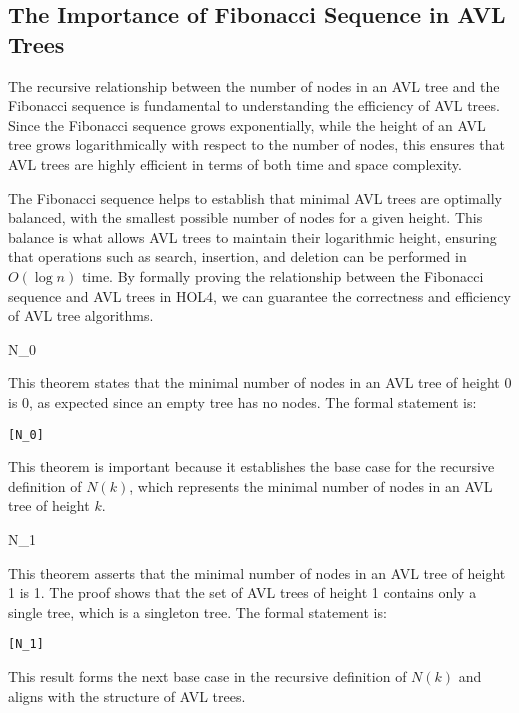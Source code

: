 \subsection{The Importance of Fibonacci Sequence in AVL Trees}

    The recursive relationship between the number of nodes in an AVL tree and the Fibonacci sequence is fundamental to understanding the efficiency of AVL trees. Since the Fibonacci sequence grows exponentially, while the height of an AVL tree grows logarithmically with respect to the number of nodes, this ensures that AVL trees are highly efficient in terms of both time and space complexity.

    The Fibonacci sequence helps to establish that minimal AVL trees are optimally balanced, with the smallest possible number of nodes for a given height. This balance is what allows AVL trees to maintain their logarithmic height, ensuring that operations such as search, insertion, and deletion can be performed in \( O(\log n) \) time. By formally proving the relationship between the Fibonacci sequence and AVL trees in HOL4, we can guarantee the correctness and efficiency of AVL tree algorithms.

    \begin{thm}{N\_0}

    This theorem states that the minimal number of nodes in an AVL tree of height 0 is 0, as expected since an empty tree has no nodes. The formal statement is:
    \begin{alltt}
    	[N_0]
    \end{alltt}
    
    \end{thm}
    This theorem is important because it establishes the base case for the recursive definition of \( N(k) \), which represents the minimal number of nodes in an AVL tree of height \( k \).


    \begin{thm}{N\_1}

    This theorem asserts that the minimal number of nodes in an AVL tree of height 1 is 1. The proof shows that the set of AVL trees of height 1 contains only a single tree, which is a singleton tree. The formal statement is:
    \begin{alltt}
    	[N_1]
    \end{alltt}
    
    \end{thm}
    This result forms the next base case in the recursive definition of \( N(k) \) and aligns with the structure of AVL trees.


